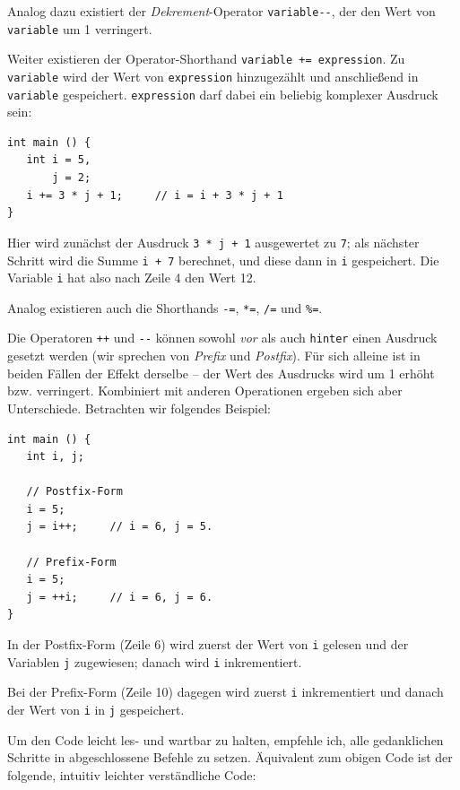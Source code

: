 {{{{Analog dazu existiert der \emph{Dekrement}-Operator \texttt{variable-{}-}, der den Wert von \texttt{variable} um 1 verringert.

Weiter existieren der Operator-Shorthand \texttt{variable += expression}. Zu \texttt{variable} wird der Wert von \texttt{expression} hinzugezählt und anschließend in \texttt{variable} gespeichert. \texttt{expression} darf dabei ein beliebig komplexer Ausdruck sein:
\begin{codebox}[Beispiel: Inkrementieren einer Variablen i mit Shorthand \texttt{+=}]
\begin{verbatim}
int main () {
   int i = 5,
       j = 2;
   i += 3 * j + 1;     // i = i + 3 * j + 1
}
\end{verbatim}
\end{codebox}
Hier wird zunächst der Ausdruck \texttt{3 * j + 1} ausgewertet zu \texttt{7}; als nächster Schritt wird die Summe \texttt{i + 7} berechnet, und diese dann in \texttt{i} gespeichert. Die Variable \texttt{i} hat also nach Zeile 4 den Wert 12.

Analog existieren auch die Shorthands \texttt{-=}, \texttt{*=}, \texttt{/=} und \texttt{\%=}.

\begin{hintbox}
Die Operatoren \texttt{++} und \texttt{-{}-} können sowohl \emph{vor} als auch \texttt{hinter} einen Ausdruck gesetzt werden (wir sprechen von \emph{Prefix} und \emph{Postfix}). Für sich alleine ist in beiden Fällen der Effekt derselbe -- der Wert des Ausdrucks wird um 1 erhöht bzw. verringert. Kombiniert mit anderen Operationen ergeben sich aber Unterschiede. Betrachten wir folgendes Beispiel:

\begin{codebox}
\begin{verbatim}
int main () {
   int i, j;

   // Postfix-Form
   i = 5;
   j = i++;		// i = 6, j = 5.

   // Prefix-Form
   i = 5;
   j = ++i;		// i = 6, j = 6.
}
\end{verbatim}
\end{codebox}

In der Postfix-Form (Zeile 6) wird zuerst der Wert von \texttt{i} gelesen und der Variablen \texttt{j} zugewiesen; danach wird \texttt{i} inkrementiert.

Bei der Prefix-Form (Zeile 10) dagegen wird zuerst \texttt{i} inkrementiert und danach der Wert von \texttt{i} in \texttt{j} gespeichert.
\end{hintbox}
%
\begin{hintbox}[]
Um den Code leicht les- und wartbar zu halten, empfehle ich, alle gedanklichen Schritte in abgeschlossene Befehle zu setzen. Äquivalent zum obigen Code ist der folgende, intuitiv leichter verständliche Code:


\end{hintbox}}}}}
